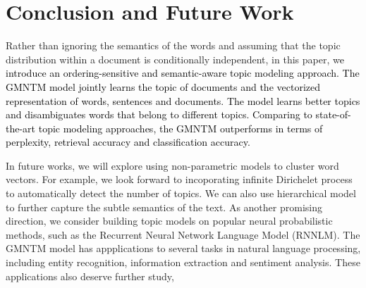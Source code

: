 \documentclass[english,letter]{article}
\renewcommand\[{\begin{equation}}
\renewcommand\]{\end{equation}}
\begin{document}
\section{Conclusion and Future Work}

Rather than ignoring the semantics of the words and assuming that
the topic distribution within a document is conditionally independent,
in this paper, w\textcolor{black}{e introduce an ordering-sensitive
and semantic-aware topic modeling approach. The GMNTM model jointly
learns the topic of documents and the vectorized representation of
words, sentences and documents. The model learns better topics and
disambiguates words that belong to different topics. Comparing to
state-of-the-art topic modeling approaches, the GMNTM outperforms
in terms of perplexity, retrieval accuracy and classification accuracy.}

In future works, we will explore using non-parametric models to cluster
word vectors. For example, we look forward to incoporating infinite
Dirichelet process to automatically detect the number of topics. We
can also use hierarchical model to further capture the subtle semantics
of the text. As another promising direction, we consider building
topic models on popular neural probabilistic methods, such as the
Recurrent Neural Network Language Model (RNNLM). The GMNTM model has
appplications to several tasks in natural language processing, including
entity recognition, information extraction and sentiment analysis.
These applications also deserve further study,
\end{document}
